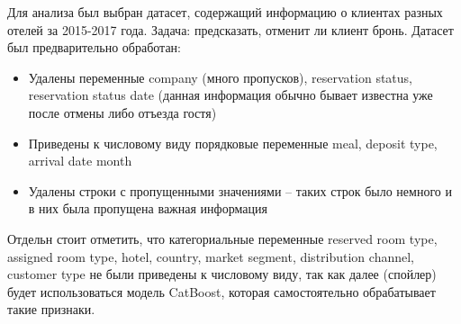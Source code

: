 Для анализа был выбран датасет, содержащий информацию о клиентах разных отелей за 2015-2017 года. Задача: предсказать, отменит ли клиент бронь. Датасет был предварительно обработан:
\begin{itemize}
	\item Удалены переменные company (много пропусков), reservation status, reservation status date (данная информация обычно бывает известна уже после отмены либо отъезда гостя)
	\item Приведены к числовому виду порядковые переменные meal, deposit type, arrival date month
	\item Удалены строки с пропущенными значениями -- таких строк было немного и в них была пропущена важная информация
\end{itemize}

Отдельн стоит отметить, что категориальные переменные reserved room type, assigned room type, hotel, country, market segment, distribution channel, customer type не были приведены к числовому виду, так как далее (спойлер) будет использоваться модель CatBoost, которая самостоятельно обрабатывает такие признаки.
